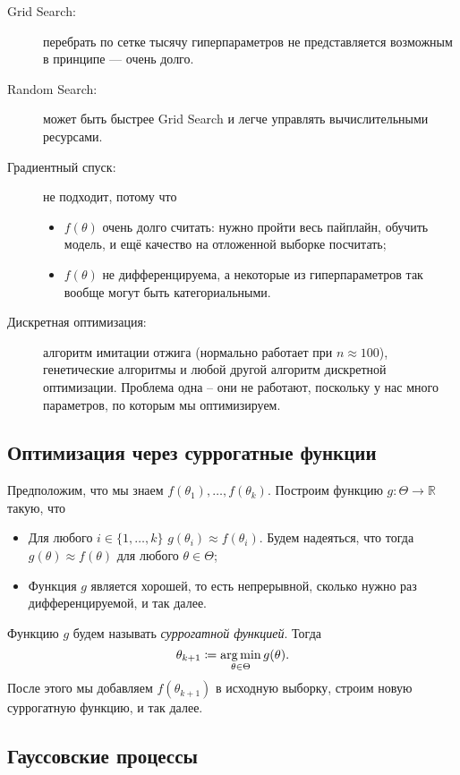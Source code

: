 \documentclass[12pt, fleqn]{article}
\begin{document}
\begin{description}
	\item[Grid Search:] перебрать по сетке тысячу гиперпараметров не представляется возможным в принципе --- очень долго.
	\item[Random Search:] может быть быстрее Grid Search и легче управлять вычислительными ресурсами.
	\item[Градиентный спуск:] не подходит, потому что 
	\begin{itemize}
		\item $f(\theta)$ очень долго считать: нужно пройти весь пайплайн, обучить модель, и ещё качество на отложенной выборке посчитать;
		\item $f(\theta)$ не дифференцируема, а некоторые из гиперпараметров так вообще могут быть категориальными. 
	\end{itemize}
	\item[Дискретная оптимизация:] алгоритм имитации отжига (нормально работает при $n \approx 100$), генетические алгоритмы и любой другой алгоритм дискретной оптимизации.
	Проблема одна -- они не работают, поскольку у нас много параметров, по которым мы оптимизируем.
\end{description}


\subsection{Оптимизация через суррогатные функции}

Предположим, что мы знаем $f(\theta_{1}), \ldots, f(\theta_{k})$.
Построим функцию $g \colon \Theta \to \mathbb{R}$  такую, что
\begin{itemize}
	\item Для любого $i \in \{1, \ldots, k\}$ $g(\theta_{i}) \approx f(\theta_{i})$.
	Будем надеяться, что тогда $g(\theta) \approx f(\theta)$ для любого $\theta \in \Theta$;
	\item Функция $g$ является хорошей, то есть непрерывной, сколько нужно раз дифференцируемой, и так далее.
\end{itemize}
Функцию $g$ будем называть {\it суррогатной функцией}.
Тогда
\[
	\theta_{k + 1} \coloneqq \mathop{\rm arg\,min}\limits\limits_{\theta \in \Theta} g(\theta).
\]
После этого мы добавляем $f(\theta_{k + 1})$ в исходную выборку, строим новую суррогатную функцию, и так далее.

\subsection{Гауссовские процессы}
\end{document}
